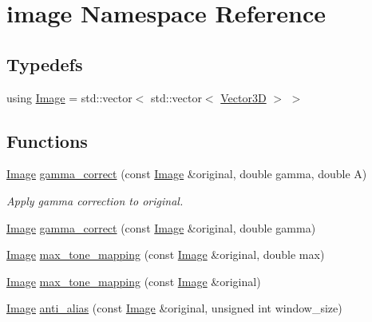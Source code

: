 \hypertarget{namespaceimage}{}\section{image Namespace Reference}
\label{namespaceimage}
\subsection*{Typedefs}
\begin{DoxyCompactItemize}
\item 
using \mbox{\hyperlink{namespaceimage_af3f0dcb372dbc1b38ba87aae9e2c780c}{Image}} = std\+::vector$<$ std\+::vector$<$ \mbox{\hyperlink{classVector3D}{Vector3D}} $>$ $>$
\end{DoxyCompactItemize}
\subsection*{Functions}
\begin{DoxyCompactItemize}
\item 
\mbox{\hyperlink{namespaceimage_af3f0dcb372dbc1b38ba87aae9e2c780c}{Image}} \mbox{\hyperlink{namespaceimage_a350994eafb0492e40cb74c116873a7ae}{gamma\+\_\+correct}} (const \mbox{\hyperlink{namespaceimage_af3f0dcb372dbc1b38ba87aae9e2c780c}{Image}} \&original, double gamma, double A)
\begin{DoxyCompactList}\small\item\em Apply gamma correction to original. \end{DoxyCompactList}\item 
\mbox{\hyperlink{namespaceimage_af3f0dcb372dbc1b38ba87aae9e2c780c}{Image}} \mbox{\hyperlink{namespaceimage_a0d356b98f4bd21ca658d5c83e191cbe2}{gamma\+\_\+correct}} (const \mbox{\hyperlink{namespaceimage_af3f0dcb372dbc1b38ba87aae9e2c780c}{Image}} \&original, double gamma)
\item 
\mbox{\hyperlink{namespaceimage_af3f0dcb372dbc1b38ba87aae9e2c780c}{Image}} \mbox{\hyperlink{namespaceimage_a3646524ebdcbde53e3d2f4bfa47a024a}{max\+\_\+tone\+\_\+mapping}} (const \mbox{\hyperlink{namespaceimage_af3f0dcb372dbc1b38ba87aae9e2c780c}{Image}} \&original, double max)
\item 
\mbox{\hyperlink{namespaceimage_af3f0dcb372dbc1b38ba87aae9e2c780c}{Image}} \mbox{\hyperlink{namespaceimage_acad5a9459043f5ce5b565e771b0867f8}{max\+\_\+tone\+\_\+mapping}} (const \mbox{\hyperlink{namespaceimage_af3f0dcb372dbc1b38ba87aae9e2c780c}{Image}} \&original)
\item 
\mbox{\hyperlink{namespaceimage_af3f0dcb372dbc1b38ba87aae9e2c780c}{Image}} \mbox{\hyperlink{namespaceimage_ae465266083a6ee29947db193e0881ff2}{anti\+\_\+alias}} (const \mbox{\hyperlink{namespaceimage_af3f0dcb372dbc1b38ba87aae9e2c780c}{Image}} \&original, unsigned int window\+\_\+size)
\end{DoxyCompactItemize}


